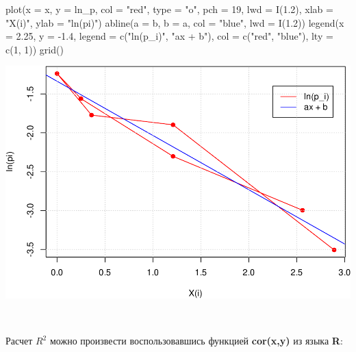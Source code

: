 \documentclass[
  14,
]{article}
\newenvironment{Shaded}{\begin{snugshade}}{\end{snugshade}}
\newcommand{\AttributeTok}[1]{\textcolor[rgb]{0.77,0.63,0.00}{#1}}
\newcommand{\DecValTok}[1]{\textcolor[rgb]{0.00,0.00,0.81}{#1}}
\newcommand{\FloatTok}[1]{\textcolor[rgb]{0.00,0.00,0.81}{#1}}
\newcommand{\FunctionTok}[1]{\textcolor[rgb]{0.00,0.00,0.00}{#1}}
\newcommand{\NormalTok}[1]{#1}
\newcommand{\SpecialCharTok}[1]{\textcolor[rgb]{0.00,0.00,0.00}{#1}}
\newcommand{\StringTok}[1]{\textcolor[rgb]{0.31,0.60,0.02}{#1}}
\begin{document}
\begin{Shaded}
\begin{Highlighting}[]
\FunctionTok{plot}\NormalTok{(}\AttributeTok{x =}\NormalTok{ x,}
     \AttributeTok{y =}\NormalTok{ ln\_p,}
     \AttributeTok{col =} \StringTok{"red"}\NormalTok{,}
     \AttributeTok{type =} \StringTok{"o"}\NormalTok{,}
     \AttributeTok{pch =} \DecValTok{19}\NormalTok{,}
     \AttributeTok{lwd =} \FunctionTok{I}\NormalTok{(}\FloatTok{1.2}\NormalTok{),}
     \AttributeTok{xlab =} \StringTok{"X(i)"}\NormalTok{, }\AttributeTok{ylab =} \StringTok{"ln(pi)"}\NormalTok{)}
\FunctionTok{abline}\NormalTok{(}\AttributeTok{a =}\NormalTok{ b, }
       \AttributeTok{b =}\NormalTok{ a, }
       \AttributeTok{col =} \StringTok{"blue"}\NormalTok{, }
       \AttributeTok{lwd =} \FunctionTok{I}\NormalTok{(}\FloatTok{1.2}\NormalTok{))}
\FunctionTok{legend}\NormalTok{(}\AttributeTok{x =} \FloatTok{2.25}\NormalTok{, }\AttributeTok{y =} \SpecialCharTok{{-}}\FloatTok{1.4}\NormalTok{, }
       \AttributeTok{legend =} \FunctionTok{c}\NormalTok{(}\StringTok{"ln(p\_i)"}\NormalTok{, }\StringTok{"ax + b"}\NormalTok{), }
       \AttributeTok{col =} \FunctionTok{c}\NormalTok{(}\StringTok{"red"}\NormalTok{, }\StringTok{"blue"}\NormalTok{),}
       \AttributeTok{lty =} \FunctionTok{c}\NormalTok{(}\DecValTok{1}\NormalTok{, }\DecValTok{1}\NormalTok{))}
\FunctionTok{grid}\NormalTok{()}
\end{Highlighting}
\end{Shaded}

\begin{center}\includegraphics[width=0.75\linewidth]{Prac3_files/figure-latex/unnamed-chunk-22-1} \end{center}

\(\ \)

Расчет \(R^2\) можно произвести воспользовавшись функцией
\textbf{cor(x,y)} из языка \textbf{R}:
\end{document}
